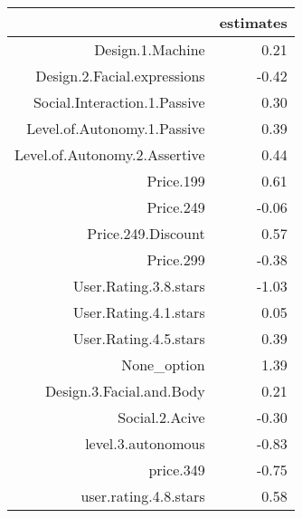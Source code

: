 \begin{table}[ht]
\centering
\begin{tabular}{rr}
  \hline
 & estimates \\ 
  \hline
Design.1.Machine & 0.21 \\ 
  Design.2.Facial.expressions & -0.42 \\ 
  Social.Interaction.1.Passive & 0.30 \\ 
  Level.of.Autonomy.1.Passive & 0.39 \\ 
  Level.of.Autonomy.2.Assertive & 0.44 \\ 
  Price.199 & 0.61 \\ 
  Price.249 & -0.06 \\ 
  Price.249.Discount & 0.57 \\ 
  Price.299 & -0.38 \\ 
  User.Rating.3.8.stars & -1.03 \\ 
  User.Rating.4.1.stars & 0.05 \\ 
  User.Rating.4.5.stars & 0.39 \\ 
  None\_option & 1.39 \\ 
  Design.3.Facial.and.Body & 0.21 \\ 
  Social.2.Acive & -0.30 \\ 
  level.3.autonomous & -0.83 \\ 
  price.349 & -0.75 \\ 
  user.rating.4.8.stars & 0.58 \\ 
   \hline
\end{tabular}
\end{table}

